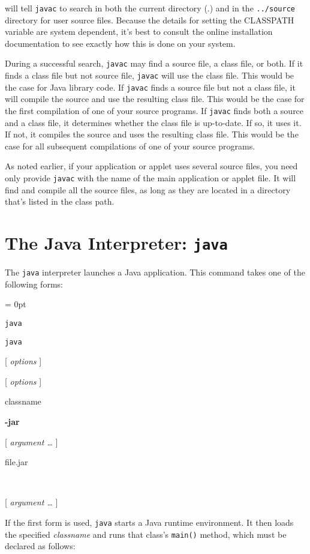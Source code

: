 \noindent will tell {\tt javac} to search in both the current directory (.)
and in the {\tt ../source} directory for user source files. Because the
details for setting the CLASSPATH variable are system dependent, it's best to
consult the online installation documentation to see exactly how this is done on
your system.

During a successful search, {\tt javac} may find a source file, a
class file, or both.   If it finds a class file but not source file,
{\tt javac} will use the class file.  This would be the case for Java
library code.  If {\tt javac} finds a source file but not a class file,
it will compile the source and use the resulting class file.  This
would be the case for the first compilation of one of your source
programs.   If {\tt javac} finds both a source and a class file, it
determines whether the class file is up-to-date.  If so, it uses it.  If
not, it compiles the source and uses the resulting class file.  This
would be the case for all subsequent compilations of one of your
source programs.

As noted earlier, if your application or applet uses several source
files, you need only provide {\tt javac} with the name of the main
application or applet file.   It will find and compile all the source
files, as long as they are located in a directory that's listed in the
class path.

\section*{The Java Interpreter: {\tt java}}
\noindent The {\tt java} interpreter launches a Java application.   This command
takes one of the following forms:

\vspace{6pt plus3pt minus2pt}\columnsep = 0pt\begin{multicols}{5}
\small
\parindent=0pc
{\tt java} 

{\tt java} 

 [ {\it options} ] 

 [ {\it options} ] 

 classname 

 {\bf -jar} 

 [ {\it argument \dots } ] 

 file.jar 

\mbox{ }

 [ {\it argument \dots } ]
\end{multicols}

\vspace{6pt plus3pt minus2pt}\noindent If the first form is used, {\tt java} starts a Java runtime
environment.   It then loads the specified {\it classname} and runs
that class's {\tt main()} method, which must be declared as follows:

